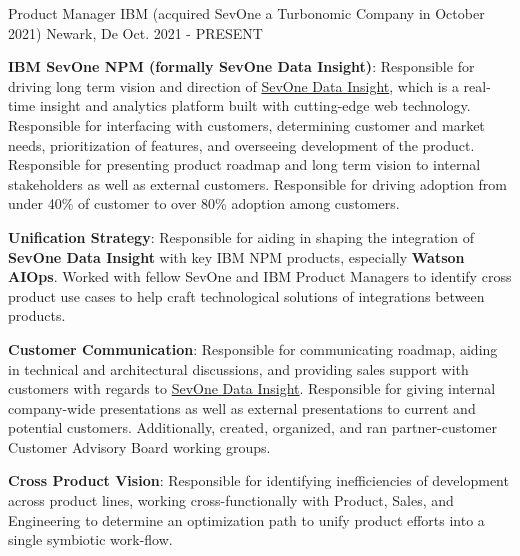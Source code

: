 \begin{cventries}
  \cventry
    {Product Manager}
    {IBM (acquired SevOne a Turbonomic Company in October 2021)}
    {Newark, De}
    {Oct. 2021 - PRESENT}
    {
      \begin{cvitems}
        \item{\textbf{IBM SevOne NPM (formally SevOne Data Insight)}: Responsible for driving long term vision and direction of \href{https://www.sevone.com/sevone-data-insight}{SevOne Data Insight}, which is a real-time insight and analytics platform built with cutting-edge web technology.  Responsible for interfacing with customers, determining customer and market needs, prioritization of features, and overseeing development of the product.  Responsible for presenting product roadmap and long term vision to internal stakeholders as well as external customers.  Responsible for driving adoption from under 40\% of customer to over 80\% adoption among customers.}
        \item{\textbf{Unification Strategy}: Responsible for aiding in shaping the integration of \textbf{SevOne Data Insight} with key IBM NPM products, especially \textbf{Watson AIOps}.  Worked with fellow SevOne and IBM Product Managers to identify cross product use cases to help craft technological solutions of integrations between products.}
        \item{\textbf{Customer Communication}: Responsible for communicating roadmap, aiding in technical and architectural discussions, and providing sales support with customers with regards to \href{https://www.sevone.com/sevone-data-insight}{SevOne Data Insight}.  Responsible for giving internal company-wide presentations as well as external presentations to current and potential customers.  Additionally, created, organized, and ran partner-customer Customer Advisory Board working groups.}
        \item{\textbf{Cross Product Vision}: Responsible for identifying inefficiencies of development across product lines, working cross-functionally with Product, Sales, and Engineering to determine an optimization path to unify product efforts into a single symbiotic work-flow.}
      \end{cvitems}
    }


\end{cventries}
